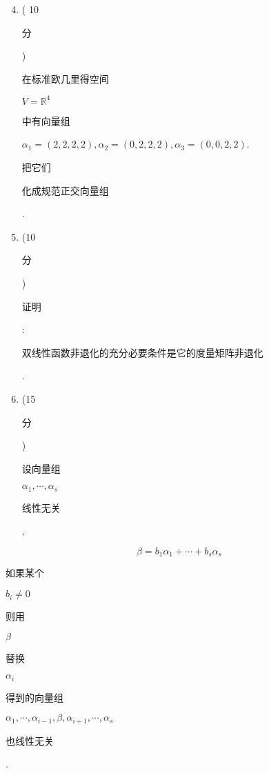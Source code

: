 \documentclass[10pt]{article}
\begin{document}
\begin{enumerate}
  \setcounter{enumi}{3}
  \item ( 10 \begin{CJK}{UTF8}{mj}分\end{CJK}) \begin{CJK}{UTF8}{mj}在标准欧几里得空间\end{CJK} $V=\mathbb{R}^{4}$ \begin{CJK}{UTF8}{mj}中有向量组\end{CJK} $\alpha_{1}=(2,2,2,2), \alpha_{2}=(0,2,2,2), \alpha_{3}=(0,0,2,2)$. \begin{CJK}{UTF8}{mj}把它们\end{CJK} \begin{CJK}{UTF8}{mj}化成规范正交向量组\end{CJK}.

  \item (10 \begin{CJK}{UTF8}{mj}分\end{CJK}) \begin{CJK}{UTF8}{mj}证明\end{CJK}: \begin{CJK}{UTF8}{mj}双线性函数非退化的充分必要条件是它的度量矩阵非退化\end{CJK}.

  \item (15 \begin{CJK}{UTF8}{mj}分\end{CJK}) \begin{CJK}{UTF8}{mj}设向量组\end{CJK} $\alpha_{1}, \cdots, \alpha_{s}$ \begin{CJK}{UTF8}{mj}线性无关\end{CJK},

\end{enumerate}
$$
\beta=b_{1} \alpha_{1}+\cdots+b_{s} \alpha_{s}
$$
\begin{CJK}{UTF8}{mj}如果某个\end{CJK} $b_{i} \neq 0$ \begin{CJK}{UTF8}{mj}则用\end{CJK} $\beta$ \begin{CJK}{UTF8}{mj}替换\end{CJK} $\alpha_{i}$ \begin{CJK}{UTF8}{mj}得到的向量组\end{CJK} $\alpha_{1}, \cdots, \alpha_{i-1}, \beta, \alpha_{i+1}, \cdots, \alpha_{s}$ \begin{CJK}{UTF8}{mj}也线性无关\end{CJK}.
\end{document}
